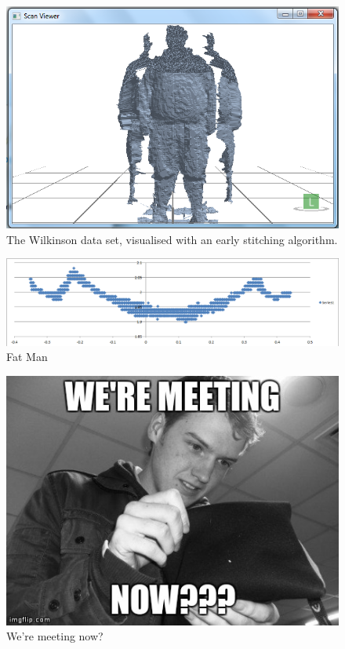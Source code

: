 \begin{figure}[h]
\begin{center}
\includegraphics[scale=0.4]{./testing/wilko1} 
\end{center}
\caption{The Wilkinson data set, visualised with an early stitching algorithm.}
\label{fig:the wilkinson data set, visualised with an early stitching algorithm}
\end{figure}

\begin{figure}[h]
\begin{center}
\includegraphics[scale=0.4]{./testing/wilko2} 
\end{center}
\caption{Fat Man}
\label{fig:fat man}
\end{figure}

\begin{figure}[h]
\begin{center}
\includegraphics[scale=0.4]{./design/nathan} 
\end{center}
\caption{We're meeting now?}
\label{fig:we're meeting now?}
\end{figure}